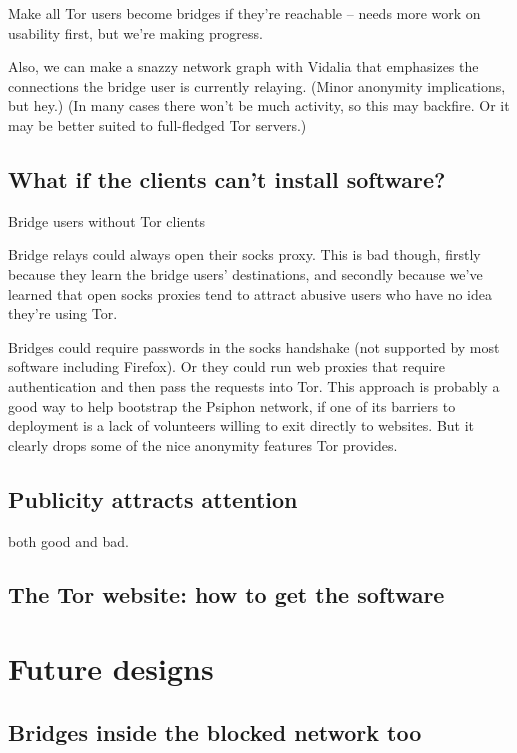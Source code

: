 \documentclass{llncs}
\begin{document}
Make all Tor users become bridges if they're reachable -- needs more work
on usability first, but we're making progress.

Also, we can make a snazzy network graph with Vidalia that emphasizes
the connections the bridge user is currently relaying. (Minor anonymity
implications, but hey.) (In many cases there won't be much activity,
so this may backfire. Or it may be better suited to full-fledged Tor
servers.)

\subsection{What if the clients can't install software?}

Bridge users without Tor clients

Bridge relays could always open their socks proxy. This is bad though,
firstly
because they learn the bridge users' destinations, and secondly because
we've learned that open socks proxies tend to attract abusive users who
have no idea they're using Tor.

Bridges could require passwords in the socks handshake (not supported
by most software including Firefox). Or they could run web proxies
that require authentication and then pass the requests into Tor. This
approach is probably a good way to help bootstrap the Psiphon network,
if one of its barriers to deployment is a lack of volunteers willing
to exit directly to websites. But it clearly drops some of the nice
anonymity features Tor provides.

\subsection{Publicity attracts attention}
\label{subsec:publicity}

both good and bad.

\subsection{The Tor website: how to get the software}



\section{Future designs}

\subsection{Bridges inside the blocked network too}
\end{document}
